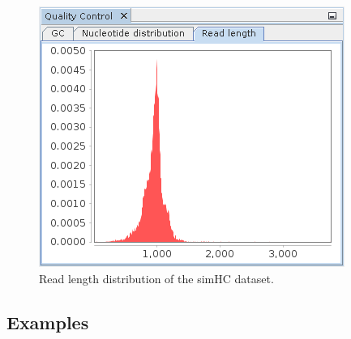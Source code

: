\begin{figure}[H]
\centering
\includegraphics[width=.8\textwidth]{img/mgx/QCreadlen}
\caption[Quality control]{Read length distribution of the simHC dataset. }
\label{qc3}
\end{figure}

\subsection{Examples}

